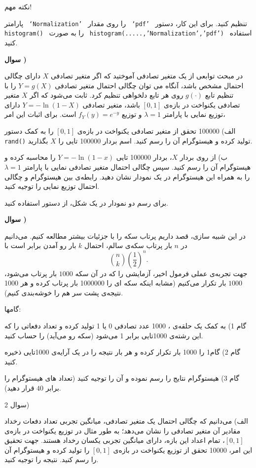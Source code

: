 \documentclass[10pt,letterpaper]{report}
\newcounter{questionnumber}
\newcommand{\Q}{
\textbf{سوال \thequestionnumber)}
\stepcounter{questionnumber}
}
\begin{document}
نکته مهم!

پارامتر 
\texttt{
`Normalization'
}
را روی مقدار 
\texttt{
`pdf'
}
تنظیم کنید. برای این کار، دستور 
\texttt{
histogram()
}
را به صورت 
\texttt{
histogram(.....,'Normalization','pdf')
}
استفاده کنید.


\Q
در مبحث توابعی از یک متغیر تصادفی آموختید که اگر متغیر تصادفی $X$ دارای چگالی احتمال  مشخص باشد، آنگاه می توان چگالی احتمال  متغیر تصادفی $Y=g(X)$ را با تنظیم تابع $g(\cdot)$ روی هر تابع دلخواهی تنظیم کرد. ثابت می‌شود که اگر $X$ متغیر تصادفی یکنواخت در بازه‌ی $[0,1]$ باشد، متغیر تصادفی 
$
Y=-\ln (1-X)
$
دارای توزیع نمایی با پارامتر $\lambda=1$ و توزیع 
$
f_Y(y)=e^{-y}
$
است. برای اثبات این امر،

الف) 100000 تحقق از متغیر تصادفی یکنواخت در بازه‌ی $[0,1]$ را به کمک دستور 
\texttt{rand()}
تولید کرده و هیستوگرام آن را رسم کنید. اسم بردار 100000 تایی را $X$ بگذارید.

ب) از روی بردار $X$، بردار 100000 تایی $Y=-\ln(1-x)$ را محاسبه کرده و هیستوگرام آن را رسم کنید. سپس چگالی احتمال متغیر تصادفی نمایی با پارامتر $\lambda=1$ را به همراه این هیستوگرام در یک نمودار نشان دهید. رابطه‌ی بین هیستوگرام و چگالی احتمال  توزیع نمایی را توجیه کنید.

برای رسم دو نمودار در یک شکل، از دستور 
\texttt{}
استفاده کنید.

\Q
در این شبیه سازی، قصد داریم پرتاب سکه را با جزئیات بیشتر مطالعه کنیم. می‌دانیم در 
$
n
$
بار پرتاب سکه‌ی سالم، احتمال 
$
k
$
بار رو آمدن برابر است با
$$
\binom{n}{k}(\frac{1}{2})^n.
$$
جهت تجربه‌ی عملی فرمول اخیر، آزمایشی را که در آن سکه
$
1000
$
بار پرتاب می‌شود،
$
1000
$
بار تکرار می‌کنیم (مشابه اینکه سکه ای را 1000000 بار پرتاب کرده و هر 1000 نتیجه‌ی پشت سر هم را خوشه‌بندی کنیم).

گامها:

گام 1) به کمک یک حلقه‌ی ،
1000 عدد تصادفی 0 یا 1 تولید کرده و تعداد دفعاتی را که این رشته‌ی 1000تایی برابر 1 می‌شود (سکه رو می‌آید) را حساب کنید.

گام 2) گام1 را 1000 بار تکرار کرده و هر بار نتیجه را در یک آرایه‌ی 1000تایی ذخیره کنید.

گام 3) هیستوگرام نتایج را رسم نموده و آن را توجیه کنید (تعداد های هیستوگرام را برابر $40$ قرار دهید).

سوال 2)

الف) می‌دانیم که چگالی احتمال یک متغیر تصادفی، میانگین تجربی تعداد دفعات رخداد مقادیر آن متغیر تصادفی را نشان می‌دهد؛ به طور مثال در توزیع یکنواخت در بازه‌ی $[0,1]$، تمام اعداد این بازه، دارای میانگین تجربی یکسان رخداد هستند. جهت تحقیق این امر، 10000 تحقق از توزیع یکنواخت در بازه‌ی $[0,1]$ را تولید کرده و هیستوگرام آن را رسم کنید. نتیجه را توجیه کنید.
\end{document}
